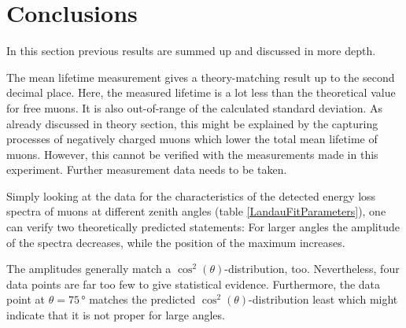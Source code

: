 \section{Conclusions}

In this section previous results are summed up and discussed in more depth.

The mean lifetime measurement gives a theory-matching result up to the second decimal place.
Here, the measured lifetime is a lot less than the theoretical value for free muons.
It is also out-of-range of the calculated standard deviation.
As already discussed in theory section, this might be explained by the capturing processes of negatively charged muons which lower the total mean lifetime of muons.
However, this cannot be verified with the measurements made in this experiment.
Further measurement data needs to be taken.

Simply looking at the data for the characteristics of the detected energy loss spectra of muons at different zenith angles (table \ref{LandauFitParameters}), one can verify two theoretically predicted statements: For larger angles the amplitude of the spectra decreases, while the position of the maximum increases. 

The amplitudes generally match a $\cos^2 (\theta)$-distribution, too.
Nevertheless, four data points are far too few to give statistical evidence.
Furthermore, the data point at $\theta = 75\,$° matches the predicted $\cos^2 (\theta)$-distribution least which might indicate that it is not proper for large angles.
	 
